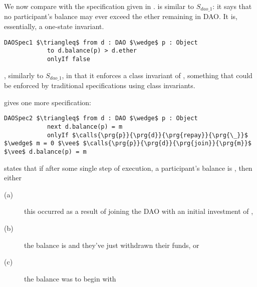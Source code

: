 \vspace{0.5cm}
We now compare with the specification given in \cite{OOPSLA22}.
 is similar to  $S_{dao\_1}$: it
says that no participant's balance may ever exceed the ether remaining 
in DAO. It is, essentially, a one-state invariant.


\begin{lstlisting}[language = Chainmail, mathescape=true, frame=lines]
DAOSpec1 $\triangleq$ from d : DAO $\wedge$ p : Object
            to d.balance(p) > d.ether
            onlyIf false
\end{lstlisting}
, similarly to $S_{dao\_1}$,   in that it enforces a class invariant of , something that could be enforced
by traditional specifications using class invariants.


 \cite{OOPSLA22}  gives one more   specification: 
 
 \begin{lstlisting}[language = Chainmail, mathescape=true, frame=lines]
DAOSpec2 $\triangleq$ from d : DAO $\wedge$ p : Object
            next d.balance(p) = m
            onlyIf $\calls{\prg{p}}{\prg{d}}{\prg{repay}}{\prg{\_}}$ $\wedge$ m = 0 $\vee$ $\calls{\prg{p}}{\prg{d}}{\prg{join}}{\prg{m}}$ $\vee$ d.balance(p) = m
\end{lstlisting}

  states that if after some single step of execution, a participant's balance is , then 
either 
\begin{description}
\item[(a)] this occurred as a result of joining the DAO with an initial investment of , 
\item[(b)] the balance is  and they've just withdrawn their funds, or 
\item[(c) ]the balance was  to begin with
\end{description}

